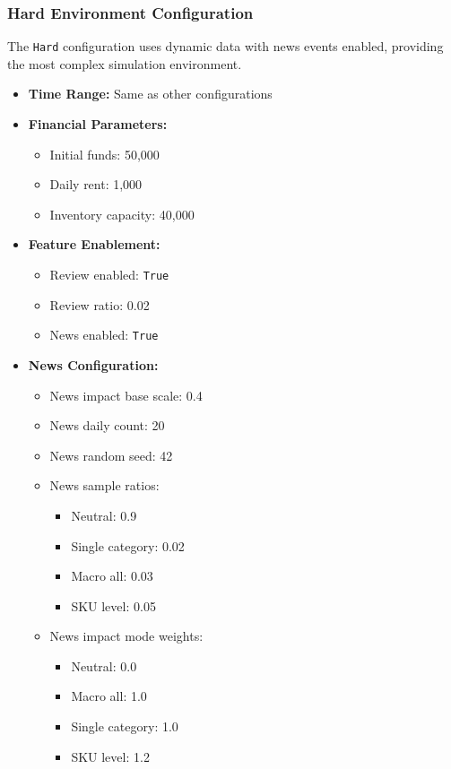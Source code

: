 \subsubsection{Hard Environment Configuration}

The \texttt{Hard} configuration uses dynamic data with news events enabled, providing the most complex simulation environment.

\begin{itemize}
    \item \textbf{Time Range:} Same as other configurations
    
    \item \textbf{Financial Parameters:}
    \begin{itemize}
        \item Initial funds: 50,000
        \item Daily rent: 1,000
        \item Inventory capacity: 40,000
    \end{itemize}
    
    \item \textbf{Feature Enablement:}
    \begin{itemize}
        \item Review enabled: \texttt{True}
        \item Review ratio: 0.02
        \item News enabled: \texttt{True}
    \end{itemize}
    
    \item \textbf{News Configuration:}
    \begin{itemize}
        \item News impact base scale: 0.4
        \item News daily count: 20
        \item News random seed: 42
        \item News sample ratios:
        \begin{itemize}
            \item Neutral: 0.9
            \item Single category: 0.02
            \item Macro all: 0.03
            \item SKU level: 0.05
        \end{itemize}
        \item News impact mode weights:
        \begin{itemize}
            \item Neutral: 0.0
            \item Macro all: 1.0
            \item Single category: 1.0
            \item SKU level: 1.2
        \end{itemize}
    \end{itemize}
    

\end{itemize}
